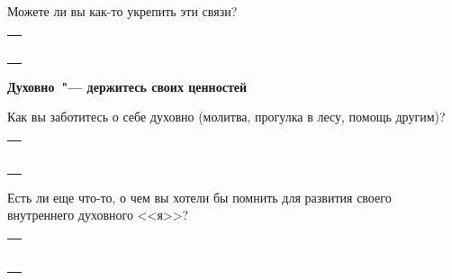 \begin{itemize}
	\itemWritingHand Можете ли вы как-то укрепить эти связи?
\end{itemize}

\setlength{\extrarowheight}{2mm}
\begin{tabularx}{0.96\textwidth}{X}
	\\
	\arrayrulecolor{gray}\hline\\
	\hline\\
	\hline\\
	\hline\\
	\hline\\
	\hline\\
\end{tabularx}
\setlength{\extrarowheight}{0mm}

\vspace{5ex}

{\large \textbf{Духовно~"--- держитесь своих ценностей}}

\begin{itemize}
	\itemWritingHand Как вы заботитесь о себе духовно (молитва, прогулка в лесу, помощь другим)?
\end{itemize}

\setlength{\extrarowheight}{2mm}
\begin{tabularx}{0.96\textwidth}{X}
	\\
	\arrayrulecolor{gray}\hline\\
	\hline\\
	\hline\\
	\hline\\
	\hline\\
	\hline\\
	\hline\\
\end{tabularx}
\setlength{\extrarowheight}{0mm}

\begin{itemize}
	\itemWritingHand Есть ли еще что-то, о чем вы хотели бы помнить для развития своего внутреннего духовного <<я>>?
\end{itemize}

\setlength{\extrarowheight}{2mm}
\begin{tabularx}{0.96\textwidth}{X}
	\\
	\arrayrulecolor{gray}\hline\\
	\hline\\
	\hline\\
	\hline\\
	\hline\\
	\hline\\
	\hline\\
\end{tabularx}
\setlength{\extrarowheight}{0mm}
